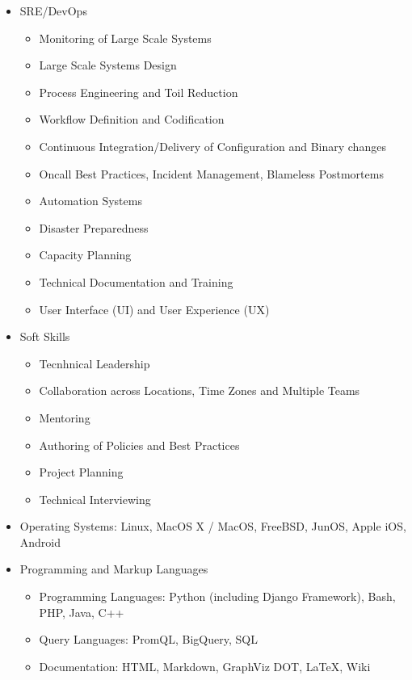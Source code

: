 \documentclass[a4paper, 11pt] {article}
\begin{document}
\begin{itemize}
\item SRE/DevOps
  \begin{itemize}
  \item Monitoring of Large Scale Systems
  \item Large Scale Systems Design
  \item Process Engineering and Toil Reduction
  \item Workflow Definition and Codification
  \item Continuous Integration/Delivery of Configuration and Binary changes
  \item Oncall Best Practices, Incident Management, Blameless Postmortems
  \item Automation Systems
  \item Disaster Preparedness
  \item Capacity Planning
  \item Technical Documentation and Training
  \item User Interface (UI) and User Experience (UX)
  \end{itemize}
\item Soft Skills
  \begin{itemize}
  \item Tecnhnical Leadership
  \item Collaboration across Locations, Time Zones and Multiple Teams
  \item Mentoring
  \item Authoring of Policies and Best Practices
  \item Project Planning
  \item Technical Interviewing
  \end{itemize}
  \item Operating Systems: Linux, MacOS X / MacOS, FreeBSD, JunOS, Apple iOS, Android
\item Programming and Markup Languages
  \begin{itemize}
  \item Programming Languages: Python (including Django Framework), Bash, PHP, Java, C++
  \item Query Languages: PromQL, BigQuery, SQL
  \item Documentation: HTML, Markdown, GraphViz DOT, LaTeX, Wiki
  \end{itemize}
\end{itemize}  
\end{document}
